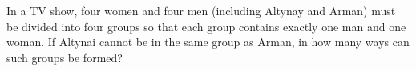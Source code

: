 In a TV show, four women and four men (including Altynay and Arman) must be divided into four groups so that each group contains exactly one man and one woman. If Altynai cannot be in the same group as Arman, in how many ways can such groups be formed?
